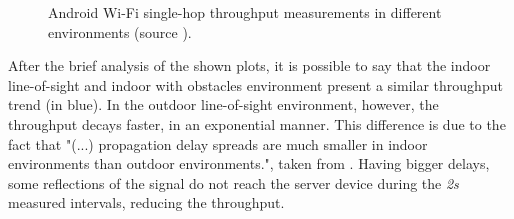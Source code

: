 \begin{figure}[ht]
	\centering
	\par\medskip
	\par\medskip        
	\caption{Android Wi-Fi single-hop throughput measurements in different environments (source \cite{throughputpaper}).}
	\label{fig:wfthroughput}
\end{figure}

After the brief analysis of the shown plots, it is possible to say that the indoor line-of-sight and indoor with obstacles environment present a similar throughput trend (in blue). In the outdoor line-of-sight environment, however, the throughput decays faster, in an exponential manner. This difference is due to the fact that "(...) propagation delay spreads are much smaller in indoor environments than outdoor environments.", taken from \cite{throughputpaper}. Having bigger delays, some reflections of the signal do not reach the server device during the \textit{2s} measured intervals, reducing the throughput.

